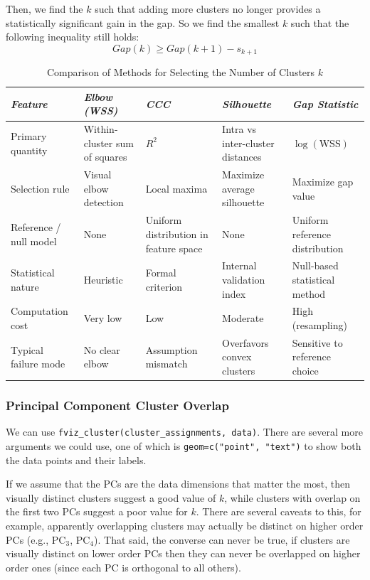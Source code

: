 Then, we find the $k$ such that adding more clusters no longer provides a statistically significant gain in the gap. So we find the smallest $k$ such that the following inequality still holds:
\[
Gap(k) \geq Gap(k+1) - s_{k+1}
\]

\bigskip

\begin{table}[H]
\centering
\renewcommand{\arraystretch}{1.5}
\begin{tabularx}{0.9\textwidth}{l X X X X}
\toprule
\textit{Feature} 
& \textit{Elbow (WSS)} 
& \textit{CCC} 
& \textit{Silhouette} 
& \textit{Gap Statistic} \\
\midrule
Primary quantity 
& Within-cluster sum of squares 
& $R^2$ 
& Intra vs inter-cluster distances 
& $\log(\text{WSS})$ \\

Selection rule 
& Visual elbow detection 
& Local maxima 
& Maximize average silhouette 
& Maximize gap value \\

Reference / null model 
& None 
& Uniform distribution in feature space 
& None 
& Uniform reference distribution \\

Statistical nature 
& Heuristic 
& Formal criterion 
& Internal validation index 
& Null-based statistical method \\

Computation cost 
& Very low 
& Low 
& Moderate 
& High (resampling) \\

Typical failure mode 
& No clear elbow 
& Assumption mismatch 
& Overfavors convex clusters 
& Sensitive to reference choice \\
\bottomrule
\end{tabularx}
\caption*{Comparison of Methods for Selecting the Number of Clusters $k$}
\end{table}

\bigskip

\subsubsection{Principal Component Cluster Overlap}

\medskip

We can use \texttt{fviz\_cluster(cluster\_assignments, data)}. There are several more arguments we could use, one of which is \texttt{geom=c("point", "text")} to show both the data points and their labels. 

If we assume that the PCs are the data dimensions that matter the most, then visually distinct clusters suggest a good value of $k$, while clusters with overlap on the first two PCs suggest a poor value for $k$. There are several caveats to this, for example, apparently overlapping clusters may actually be distinct on higher order PCs (e.g., PC$_3$, PC$_4$). That said, the converse can never be true, if clusters are visually distinct on lower order PCs then they can never be overlapped on higher order ones (since each PC is orthogonal to all others). 

